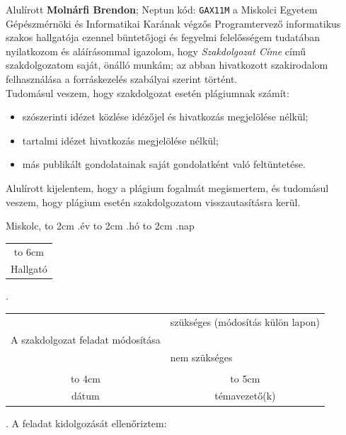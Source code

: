 \documentclass[12pt,a4paper]{report}
\begin{document}
Alulírott \textbf{Molnárfi Brendon}; Neptun kód: \texttt{GAX11M} a Miskolci Egyetem Gépészmérnöki és Informatikai Karának végzős Programtervező informatikus szakos hallgatója ezennel büntetőjogi és fegyelmi felelősségem tudatában nyilatkozom és aláírásommal igazolom, hogy \textit{Szakdolgozat Címe}
című szakdolgozatom saját, önálló munkám; az abban hivatkozott szakirodalom
felhasználása a forráskezelés szabályai szerint történt.\\

Tudomásul veszem, hogy szakdolgozat esetén plágiumnak számít:
\begin{itemize}
\item szószerinti idézet közlése idézőjel és hivatkozás megjelölése nélkül;
\item tartalmi idézet hivatkozás megjelölése nélkül;
\item más publikált gondolatainak saját gondolatként való feltüntetése.
\end{itemize}

Alulírott kijelentem, hogy a plágium fogalmát megismertem, és tudomásul veszem, hogy
plágium esetén szakdolgozatom visszautasításra kerül.

\vspace*{3cm}

\noindent Miskolc, \hbox to 2cm{\dotfill} .év \hbox to 2cm{\dotfill} .hó \hbox to 2cm{\dotfill} .nap

\vspace*{3cm}

\hspace*{8cm}\begin{tabular}{c}
\hbox to 6cm{\dotfill}\\
Hallgató
\end{tabular}

\newpage

.

\begin{tabular}{cl}
&szükséges (módosítás külön lapon) \\
A szakdolgozat feladat módosítása& \\
& nem szükséges\\
&\\
\hbox to 4cm{\dotfill}&\multicolumn{1}{c}{\hbox to 5cm{\dotfill}}\\
dátum& \multicolumn{1}{c}{témavezető(k)}
\end{tabular}
\vskip1.5mm

. A feladat kidolgozását ellenőriztem:
\end{document}

